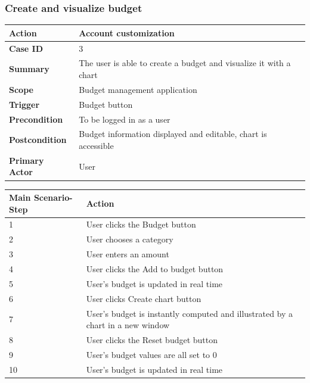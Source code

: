 \documentclass[letterpaper]{article}
\begin{document}
		\subsubsection{Create and visualize budget}
		
		\begin{center}
			\begin{tabular}{ | m{3.5cm} | m{7.5cm}| } 
				\hline
				\textbf{Action} & Account customization \\ 
				\hline
				\textbf{Case ID} & 3 \\ 
				\hline
				\textbf{Summary} & The user is able to create a budget and visualize it with a chart \\
				\hline
				\textbf{Scope} & Budget management application \\ 
				\hline
				\textbf{Trigger} & Budget button \\
				\hline
				\textbf{Precondition} & To be logged in as a user \\ 
				\hline
				\textbf{Postcondition} & Budget information displayed and editable, chart is accessible \\ 
				\hline
				\textbf{Primary Actor} & User \\ 
				\hline
			\end{tabular}
		
			\vspace{2mm}
		
			\begin{tabular}{ | m{3.5cm} | m{7.5cm}| } 
				\hline
				\textbf{Main Scenario-Step} & \textbf{Action} \\ 
				\hline
				1 & User clicks the Budget button \\ 
				\hline
				2 & User chooses a category \\ 
				\hline
				3 & User enters an amount \\ 
				\hline
				4 & User clicks the Add to budget button \\ 
				\hline
				5 & User's budget is updated in real time \\ 
				\hline
				6 & User clicks Create chart button \\ 
				\hline
				7 & User's budget is instantly computed and illustrated by a chart in a new window \\ 
				\hline
				8 & User clicks the Reset budget button \\ 
				\hline
				9 & User's budget values are all set to 0 \\
				\hline
				10 & User's budget is updated in real time \\  
				\hline
			\end{tabular}
		\end{center}
\end{document}
